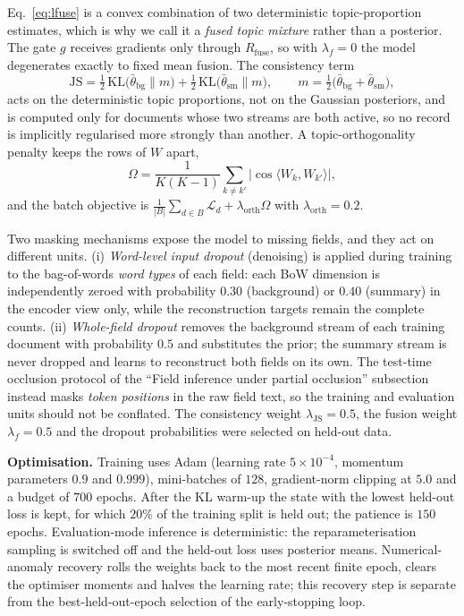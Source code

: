 \documentclass[Journal,letterpaper,NoLists]{ascelike-new}
\begin{document}
Eq.~\eqref{eq:lfuse} is a convex combination of two deterministic topic-proportion estimates,
which is why we call it a \emph{fused topic mixture} rather than a posterior. The gate
$g$ receives gradients only through $R_{\mathrm{fuse}}$, so with $\lambda_f=0$ the model
degenerates exactly to fixed mean fusion. The consistency term
\begin{equation}
\mathrm{JS}=\tfrac12\,\mathrm{KL}\!\big(\bar\theta_{\mathrm{bg}}\|m\big)
+\tfrac12\,\mathrm{KL}\!\big(\bar\theta_{\mathrm{sm}}\|m\big),
\qquad m=\tfrac12\big(\bar\theta_{\mathrm{bg}}+\bar\theta_{\mathrm{sm}}\big),
\end{equation}
acts on the deterministic topic proportions, not on the Gaussian posteriors, and is computed only
for documents whose two streams are both active, so no record is implicitly regularised more
strongly than another. A topic-orthogonality penalty keeps the rows of $W$ apart,
\begin{equation}
\Omega=\frac{1}{K(K-1)}\sum_{k\neq k'}\big|\cos\langle W_k,W_{k'}\rangle\big|,
\end{equation}
and the batch objective is $\frac{1}{|B|}\sum_{d\in B}\mathcal{L}_d
+\lambda_{\mathrm{orth}}\Omega$ with $\lambda_{\mathrm{orth}}=0.2$.

Two masking mechanisms expose the model to missing fields, and they act on different units.
(i) \emph{Word-level input dropout} (denoising) is applied during training to the bag-of-words
\emph{word types} of each field: each BoW dimension is independently zeroed with probability
$0.30$ (background) or $0.40$ (summary) in the encoder view only, while the reconstruction
targets remain the complete counts. (ii) \emph{Whole-field dropout} removes the background stream
of each training document with probability $0.5$ and substitutes the prior; the summary stream is
never dropped and learns to reconstruct both fields on its own. The test-time occlusion protocol
of the ``Field inference under partial occlusion'' subsection instead masks \emph{token positions} in the raw field text, so the
training and evaluation units should not be conflated. The consistency weight
$\lambda_{\mathrm{JS}}=0.5$, the fusion weight $\lambda_f=0.5$ and the dropout probabilities were
selected on held-out data.

\noindent\textbf{Optimisation.} Training uses Adam (learning rate $5\times10^{-4}$, momentum parameters $0.9$ and $0.999$),
mini-batches of $128$, gradient-norm clipping at $5.0$ and a budget of $700$ epochs. After the KL
warm-up the state with the lowest held-out loss is kept, for which $20\%$ of the training split is
held out; the patience is $150$ epochs. Evaluation-mode inference is deterministic: the
reparameterisation sampling is switched off and the held-out loss uses posterior means.
Numerical-anomaly recovery rolls the weights back to the most recent finite epoch, clears the
optimiser moments and halves the learning rate; this recovery step is separate from the
best-held-out-epoch selection of the early-stopping loop.
\end{document}
